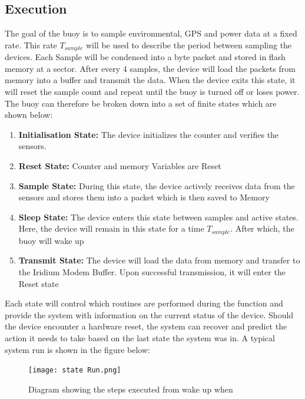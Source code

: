 \subsection{Execution}

The goal of the buoy is to sample environmental, GPS and power data at a fixed rate. This rate $T_{sample}$ will be used to describe the period between sampling the devices. Each Sample will be condensed into a byte packet and stored in flash memory at a sector. After every 4 samples, the device will load the packets from memory into a buffer and transmit the data. When the device exits this state, it will reset the sample count and repeat until the buoy is turned off or loses power. The buoy can therefore be broken down into a set of finite states which are shown below:

\begin{enumerate}
    \item \textbf{Initialisation State:} The device initializes the counter and verifies the sensors.
    \item \textbf{Reset State:} Counter and memory Variables are Reset
    \item \textbf{Sample State:} During this state, the device actively receives data from the sensors and stores them into a packet which is then saved to Memory
    \item \textbf{Sleep State:} The device enters this state between samples and active states. Here, the device will remain in this state for a time $T_{sample}$. After which, the buoy will wake up 
    \item \textbf{Transmit State:} The device will load the data from memory and transfer to the Iridium Modem Buffer. Upon successful transmission, it will enter the Reset state
\end{enumerate}

Each state will control which routines are performed during the function and provide the system with information on the current status of the device. Should the device encounter a hardware reset, the system can recover and predict the action it needs to take based on the last state the system was in. A typical system run is shown in the figure below:

\begin{figure}[H]
    \centering
    \texttt{[image: state Run.png]}
    \caption{Diagram showing the steps executed from wake up when }
    \label{fig:state_run}
\end{figure}

